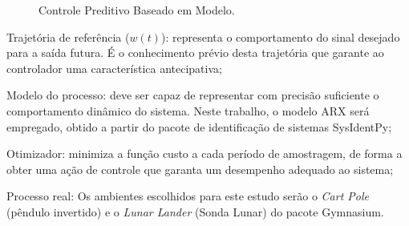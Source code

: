 \documentclass[12pt,           %
a4paper,                       %
openany,                       %
oneside,                       %
chapter=TITLE,                 %
english,                       %
spanish,                       %
brazil,                        %
sumario=tradicional]{abntex2}  %
\begin{document}
\begin{OnehalfSpace}
\begin{figure}[H] %
\vspace*{-0.2cm}
\centering
\caption{Controle Preditivo Baseado em Modelo.}
\label{fig:cpbm}
\end{figure}
\vspace*{-0.7cm}
{\raggedright {}}

Trajetória de referência ($w(t)$): representa o comportamento do sinal desejado para a saída futura. É o conhecimento prévio desta trajetória que garante ao controlador uma característica antecipativa;

Modelo do processo:  deve ser capaz de representar com precisão suficiente o comportamento dinâmico do sistema. Neste trabalho, o modelo ARX será empregado, obtido a partir do pacote de identificação de sistemas SysIdentPy;

Otimizador: minimiza a função custo a cada período de amostragem, de forma a obter uma ação de controle que garanta um desempenho adequado ao sistema;

Processo real: Os ambientes escolhidos para este estudo serão o \textit{Cart Pole} (pêndulo invertido) e o \textit{Lunar Lander} (Sonda Lunar) do pacote Gymnasium.


\end{OnehalfSpace}
\end{document}
